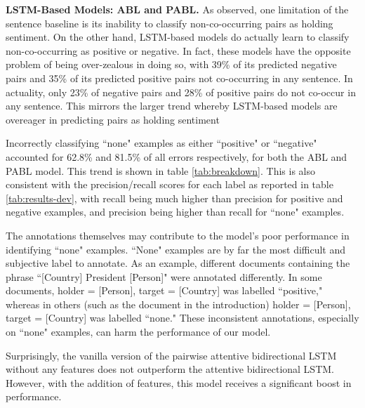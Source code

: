 \documentclass[11pt,a4paper]{article}
\begin{document}
\noindent\textbf{LSTM-Based Models: ABL and PABL.} %
As observed, one limitation of the sentence baseline is its inability to classify non-co-occurring pairs as holding sentiment.
On the other hand, LSTM-based models do actually learn to classify non-co-occurring as positive or negative.
In fact, these models have the opposite problem of being over-zealous in doing so, with 39\% of its predicted negative pairs and 35\% of its predicted positive pairs not co-occurring in any sentence.
In actuality, only 23\% of negative pairs and 28\% of positive pairs do not co-occur in any sentence.
This mirrors the larger trend whereby LSTM-based models are overeager in predicting pairs as holding sentiment 
\par Incorrectly classifying ``none" examples as either ``positive" or ``negative" accounted for 62.8\% and 81.5\% of all errors respectively, for both the ABL and PABL model.
This trend is shown in table \ref{tab:breakdown}.
This is also consistent with the precision/recall scores for each label as reported in table \ref{tab:results-dev}, with recall being much higher than precision for positive and negative examples, and precision being higher than recall for ``none" examples.
\par The annotations themselves may contribute to the model's poor performance in identifying ``none" examples.
``None" examples are by far the most difficult and subjective label to annotate.
As an example, different documents containing the phrase ``[Country] President [Person]" were annotated differently.
In some documents, holder = [Person], target = [Country] was labelled ``positive," whereas in others (such as the document in the introduction) holder = [Person], target = [Country] was labelled ``none."
These inconsistent annotations, especially on ``none" examples, can harm the performance of our model.
\par Surprisingly, the vanilla version of the pairwise attentive bidirectional LSTM without any features does not outperform the attentive bidirectional LSTM.
However, with the addition of features, this model receives a significant boost in performance.
\end{document}
